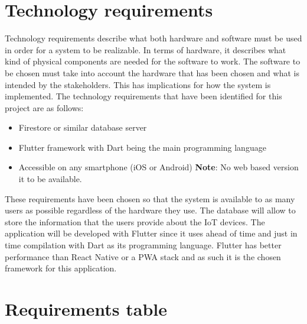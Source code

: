 \documentclass{scrreprt}
\begin{document}
\section{Technology requirements}

Technology requirements describe what both hardware and software must be
used in order for a system to be realizable. In terms of hardware, it describes
what kind of physical components are needed for the software to work. The
software to be chosen must take into account the hardware that has been
chosen and what is intended by the stakeholders. This has implications for
how the system is implemented.
\newline
The technology requirements that have been identified for this project are as follows:
\begin{itemize}
    \item Firestore or similar database server
    \item Flutter framework with Dart being the main programming language
    \item Accessible on any smartphone (iOS or Android) \newline \textbf{Note}: No web based version it to be available.
\end{itemize}
These requirements have been chosen so that the system is available to as
many users as possible regardless of the hardware they use. The database
will allow to store the information that the users provide about the IoT
devices. The application will be developed with Flutter since it uses ahead
of time and just in time compilation with Dart as its programming language.
Flutter has better performance than React Native or a PWA stack and as such it is the chosen framework for
this application.

\section{Requirements table}
\end{document}

